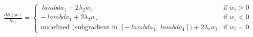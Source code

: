 \documentclass[preview]{standalone}
\begin{document}
\begin{align*}
\frac{\partial R(w)}{\partial w_i} =\begin{cases}\ lambda_1  + 2\lambda_2 w_i & \text{if } w_i > 0 \\-\ lambda_1  + 2\lambda_2 w_i & \text{if } w_i < 0 \\\text{undefined (subgradient in } [-\ lambda_1 , \ lambda_1 ]) + 2\lambda_2 w_i & \text{if } w_i = 0\end{cases}
\end{align*}
\end{document}
